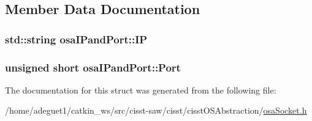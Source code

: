\subsection{Member Data Documentation}
\hypertarget{structosa_i_pand_port_aae6975367437b9d6f2f031696e9d84aa}{
\subsubsection[{I\-P}]{\setlength{\rightskip}{0pt plus 5cm}std\-::string osa\-I\-Pand\-Port\-::\-I\-P}}\label{structosa_i_pand_port_aae6975367437b9d6f2f031696e9d84aa}
\hypertarget{structosa_i_pand_port_af453d309ea5394037e662725ac6dee10}{
\subsubsection[{Port}]{\setlength{\rightskip}{0pt plus 5cm}unsigned short osa\-I\-Pand\-Port\-::\-Port}}\label{structosa_i_pand_port_af453d309ea5394037e662725ac6dee10}


The documentation for this struct was generated from the following file\-:\begin{DoxyCompactItemize}
\item 
/home/adeguet1/catkin\-\_\-ws/src/cisst-\/saw/cisst/cisst\-O\-S\-Abstraction/\hyperlink{osa_socket_8h}{osa\-Socket.\-h}\end{DoxyCompactItemize}
